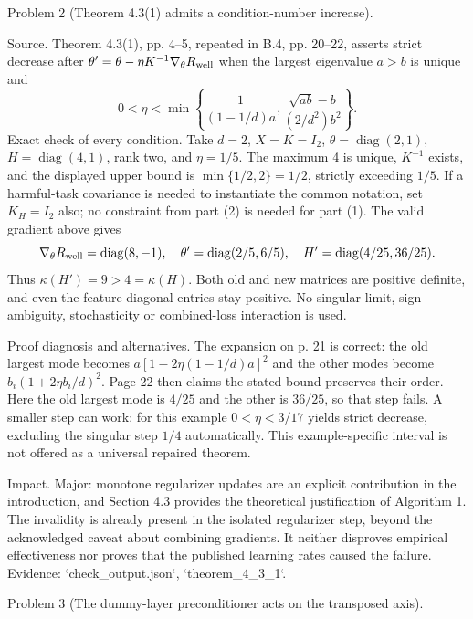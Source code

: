 \documentclass[10pt]{article}
\begin{document}
Problem 2 (Theorem 4.3(1) admits a condition-number increase).\par
Source. Theorem 4.3(1), pp. 4–5, repeated in B.4, pp. 20–22, asserts strict decrease after \(\theta'=\theta-\eta K^{-1}\nabla_\theta R_{\rm well}\) when the largest eigenvalue \(a>b\) is unique and \[0<\eta<\min\left\{\frac1{(1-1/d)a},\frac{\sqrt{ab}-b}{(2/d^2)b^2}\right\}.\] Exact check of every condition. Take \(d=2\), \(X=K=I_2\), \(\theta=\operatorname{diag}(2,1)\), \(H=\operatorname{diag}(4,1)\), rank two, and \(\eta=1/5\). The maximum 4 is unique, \(K^{-1}\) exists, and the displayed upper bound is \(\min\{1/2,2\}=1/2\), strictly exceeding \(1/5\). If a harmful-task covariance is needed to instantiate the common notation, set \(K_H=I_2\) also; no constraint from part (2) is needed for part (1). The valid gradient above gives \[\nabla_\theta R_{\rm well}=\operatorname{diag}(8,-1),\quad
\theta'=\operatorname{diag}(2/5,6/5),\quad
H'=\operatorname{diag}(4/25,36/25).\] Thus \(\kappa(H')=9>4=\kappa(H)\). Both old and new matrices are positive definite, and even the feature diagonal entries stay positive. No singular limit, sign ambiguity, stochasticity or combined-loss interaction is used.\par
Proof diagnosis and alternatives. The expansion on p. 21 is correct: the old largest mode becomes \(a[1-2\eta(1-1/d)a]^2\) and the other modes become \(b_i(1+2\eta b_i/d)^2\). Page 22 then claims the stated bound preserves their order. Here the old largest mode is \(4/25\) and the other is \(36/25\), so that step fails. A smaller step can work: for this example \(0<\eta<3/17\) yields strict decrease, excluding the singular step \(1/4\) automatically. This example-specific interval is not offered as a universal repaired theorem.\par
Impact. Major: monotone regularizer updates are an explicit contribution in the introduction, and Section 4.3 provides the theoretical justification of Algorithm 1. The invalidity is already present in the isolated regularizer step, beyond the acknowledged caveat about combining gradients. It neither disproves empirical effectiveness nor proves that the published learning rates caused the failure. Evidence: `check\_output.json`, `theorem\_4\_3\_1`.\par
Problem 3 (The dummy-layer preconditioner acts on the transposed axis).\par
\end{document}
